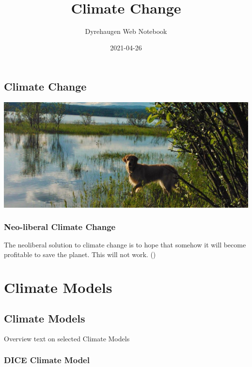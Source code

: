 \documentclass[
]{book}
\title{Climate Change}
\author{Dyrehaugen Web Notebook}
\date{2021-04-26}
\begin{document}
\maketitle

{
\setcounter{tocdepth}{1}
\tableofcontents
}
\hypertarget{climate-change}{%
\chapter{Climate Change}\label{climate-change}}

\includegraphics{fig/zelda.jpg}

\hypertarget{neo-liberal-climate-change}{%
\section{Neo-liberal Climate Change}\label{neo-liberal-climate-change}}

The neoliberal solution to climate change is to hope
that somehow it will become profitable to save the planet.
This will not work.
(\citet{ExistentialComics})

\hypertarget{part-climate-models}{%
\part{Climate Models}\label{part-climate-models}}

\hypertarget{climate-models}{%
\chapter{Climate Models}\label{climate-models}}

Overview text on selected Climate Models

\hypertarget{dice-climate-model}{%
\section{DICE Climate Model}\label{dice-climate-model}}
\end{document}
